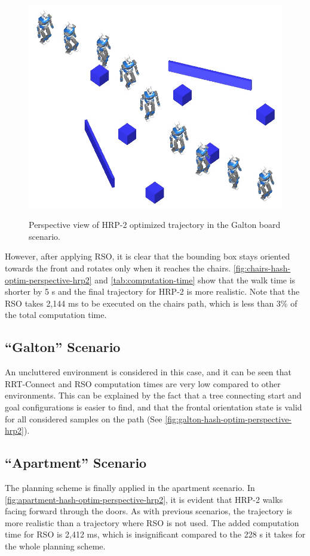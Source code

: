 \begin{figure}
  \centering
      {\includegraphics[width = \linewidth]{src/chap1-path-optimization/galton-hash-optim-perspective-hrp2.png}}
      \caption{Perspective view of HRP-2 optimized trajectory in the
        Galton board scenario.}
      \label{fig:galton-hash-optim-perspective-hrp2}
\end{figure}

However, after applying RSO, it is clear that the bounding box stays
oriented towards the front and rotates only when it reaches the
chairs. \autoref{fig:chairs-hash-optim-perspective-hrp2} and
\autoref{tab:computation-time} show that the walk time is shorter by 5
s and the final trajectory for HRP-2 is more realistic. Note that the
RSO takes 2,144 ms to be executed on the chairs path, which is less
than 3\% of the total computation time.

\subsection{``Galton'' Scenario}
\noindent An uncluttered environment is considered in this case, and
it can be seen that RRT-Connect and RSO computation times are very low
compared to other environments. This can be explained by the fact that
a tree connecting start and goal configurations is easier to find, and
that the frontal orientation state is valid for all considered samples
on the path (See \autoref{fig:galton-hash-optim-perspective-hrp2}).

\subsection{``Apartment'' Scenario}
\noindent The planning scheme is finally applied in the apartment
scenario. In \autoref{fig:apartment-hash-optim-perspective-hrp2}, it
is evident that HRP-2 walks facing forward through the doors. As with
previous scenarios, the trajectory is more realistic than a trajectory
where RSO is not used. The added computation time for RSO is 2,412 ms,
which is insignificant compared to the 228 s it takes for the whole
planning scheme.

